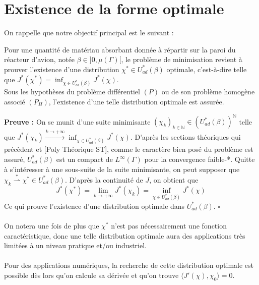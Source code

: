 \section{Existence de la forme optimale}

On rappelle que notre objectif principal est le suivant :

\begin{tcolorbox}[colback=green!5!white,colframe=green!75!black,title=Définition et Théorème 7.1: Résolution du problème de minimisation de l'énergie]

Pour une quantité de matériau absorbant donnée à répartir sur la paroi du réacteur d'avion, notée $\beta\in ]0,\mu(\Gamma)[$, le problème de minimisation revient à prouver l'existence d'une distribution $\chi^*\in U_{ad}^*(\beta)$ optimale, c'est-à-dire telle que $\displaystyle J^*(\chi^*) = \inf_{\chi \in U_{ad}^*(\beta)}J^*(\chi).$\\
Sous les hypothèses du problème différentiel $(P)$ ou de son problème homogène associé $(P_H)$, l'existence d'une telle distribution optimale est assurée.

\end{tcolorbox}
\textbf{Preuve :} On se munit d'une suite minimisante $\displaystyle (\chi_k)_{k\in \mathbb{N}}\in (U^*_{ad}(\beta))^\mathbb{N}$ telle que $\displaystyle J^*(\chi_k) \xrightarrow{k\to +\infty} \inf_{\chi \in U^*_{ad}(\beta)}J^*(\chi)$.
D'après les sections théoriques qui précèdent et [Poly Théorique ST], comme le caractère bien posé du problème est assuré, $U^*_{ad}(\beta)$ est un compact de $L^\infty(\Gamma)$ pour la convergence faible-*. Quitte à s'intéresser à une sous-suite de la suite minimisante, on peut supposer que $\chi_k \stackrel{\ast}{\rightharpoonup} \chi^*\in U^*_{ad}(\beta)$.
D'après la continuité de $J$, on obtient que
\[J^*(\chi^*) = \lim_{k\to +\infty} J^*(\chi_k) = \inf_{\chi \in U^*_{ad}(\beta)}J^*(\chi)\]
Ce qui prouve l'existence d'une distribution optimale dans $U^*_{ad}(\beta)$. $\square$ \\ \\
On notera une fois de plus que $\chi^*$ n'est pas nécessairement une fonction caractéristique, donc une telle distribution optimale aura des applications très limitées à un niveau pratique et/ou industriel.\\ \\
Pour des applications numériques, la recherche de cette distribution optimale est possible dès lors qu'on calcule sa dérivée et qu'on trouve $\langle J'(\chi), \chi_0\rangle = 0$.
